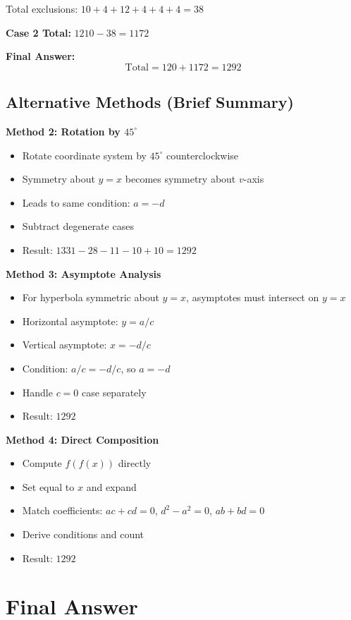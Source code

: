 \documentclass[12pt]{article}
\begin{document}
Total exclusions: $10 + 4 + 12 + 4 + 4 + 4 = 38$

\textbf{Case 2 Total:} $1210 - 38 = 1172$

\textbf{Final Answer:}
\[\text{Total} = 120 + 1172 = 1292\]

\subsection{Alternative Methods (Brief Summary)}

\textbf{Method 2: Rotation by $45^\circ$}
\begin{itemize}
    \item Rotate coordinate system by $45^\circ$ counterclockwise
    \item Symmetry about $y=x$ becomes symmetry about $v$-axis
    \item Leads to same condition: $a=-d$
    \item Subtract degenerate cases
    \item Result: $1331 - 28 - 11 - 10 + 10 = 1292$
\end{itemize}

\textbf{Method 3: Asymptote Analysis}
\begin{itemize}
    \item For hyperbola symmetric about $y=x$, asymptotes must intersect on $y=x$
    \item Horizontal asymptote: $y = a/c$
    \item Vertical asymptote: $x = -d/c$
    \item Condition: $a/c = -d/c$, so $a = -d$
    \item Handle $c=0$ case separately
    \item Result: $1292$
\end{itemize}

\textbf{Method 4: Direct Composition}
\begin{itemize}
    \item Compute $f(f(x))$ directly
    \item Set equal to $x$ and expand
    \item Match coefficients: $ac+cd=0$, $d^2-a^2=0$, $ab+bd=0$
    \item Derive conditions and count
    \item Result: $1292$
\end{itemize}

\section{Final Answer}
\end{document}
